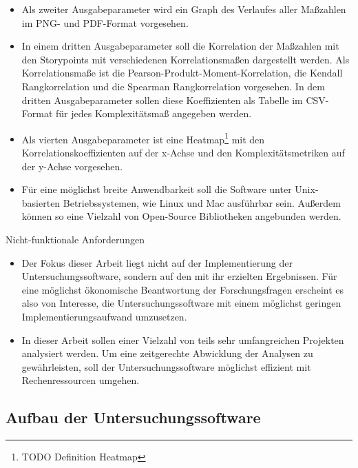 \begin{itemize}
\item
    Als zweiter Ausgabeparameter wird ein Graph des Verlaufes aller
    Maßzahlen im \ac{PNG}- und \ac{PDF}-Format vorgesehen.
\item
    In einem dritten Ausgabeparameter soll die Korrelation der Maßzahlen
    mit den Storypoints mit verschiedenen Korrelationsmaßen dargestellt
    werden. Als Korrelationsmaße ist die
    Pearson-Produkt-Moment-Korrelation, die Kendall Rangkorrelation und
    die Spearman Rangkorrelation vorgesehen. In dem dritten
    Ausgabeparameter sollen diese Koeffizienten als Tabelle im \ac{CSV}-Format
    für jedes Komplexitätsmaß angegeben werden.
\item
    Als vierten Ausgabeparameter ist eine Heatmap\footnote{TODO Definition
    Heatmap} mit den Korrelationskoeffizienten auf der x-Achse und den
    Komplexitätsmetriken auf der y-Achse vorgesehen.
\end{itemize}

\begin{itemize}
\item
    Für eine möglichst breite Anwendbarkeit soll die Software unter
    Unix-basierten Betriebssystemen, wie Linux und Mac ausführbar sein.
    Außerdem können so eine Vielzahl von Open-Source Bibliotheken
    angebunden werden.
\end{itemize}

Nicht-funktionale Anforderungen

\begin{itemize}
\item
    Der Fokus dieser Arbeit liegt nicht auf der Implementierung der
    Untersuchungssoftware, sondern auf den mit ihr erzielten Ergebnissen.
    Für eine möglichst ökonomische Beantwortung der Forschungsfragen
    erscheint es also von Interesse, die Untersuchungssoftware mit einem
    möglichst geringen Implementierungsaufwand umzusetzen.
\item
    In dieser Arbeit sollen einer Vielzahl von teils sehr umfangreichen
    Projekten analysiert werden. Um eine zeitgerechte Abwicklung der
    Analysen zu gewährleisten, soll der Untersuchungssoftware möglichst
    effizient mit Rechenressourcen umgehen.
\end{itemize}

\subsection{Aufbau der Untersuchungssoftware}\label{Aufbau-der-Untersuchungssoftware}

